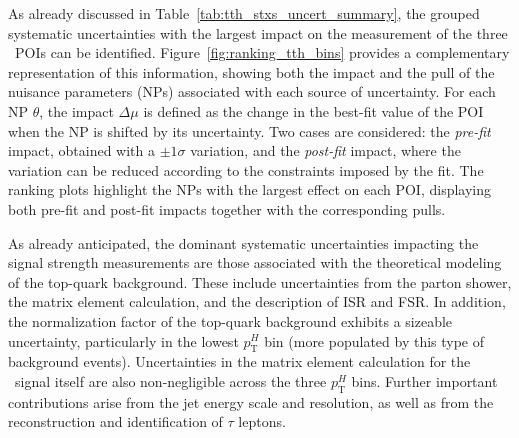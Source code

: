 As already discussed in Table~\ref{tab:tth_stxs_uncert_summary}, the grouped systematic uncertainties with the largest impact on the measurement of the three \ttH\ POIs can be identified. 
Figure~\ref{fig:ranking_tth_bins} provides a complementary representation of this information, showing both the impact and the pull of the nuisance parameters (NPs) associated with each source of uncertainty. 
For each NP $\theta$, the impact $\Delta\mu$ is defined as the change in the best-fit value of the POI when the NP is shifted by its uncertainty. 
Two cases are considered: the \textit{pre-fit} impact, obtained with a $\pm 1\sigma$ variation, and the \textit{post-fit} impact, where the variation can be reduced according to the constraints imposed by the fit. 
The ranking plots highlight the NPs with the largest effect on each POI, displaying both pre-fit and post-fit impacts together with the corresponding pulls.

As already anticipated, the dominant systematic uncertainties impacting the signal strength measurements are those associated with the theoretical modeling of the top-quark background. 
These include uncertainties from the parton shower, the matrix element calculation, and the description of ISR and FSR. 
In addition, the normalization factor of the top-quark background exhibits a sizeable uncertainty, particularly in the lowest $p_{\text{T}}^{H}$ bin (more populated by this type of background events). 
Uncertainties in the matrix element calculation for the \ttH\ signal itself are also non-negligible across the three $p_{\text{T}}^{H}$ bins. 
Further important contributions arise from the jet energy scale and resolution, as well as from the reconstruction and identification of $\tau$ leptons.


